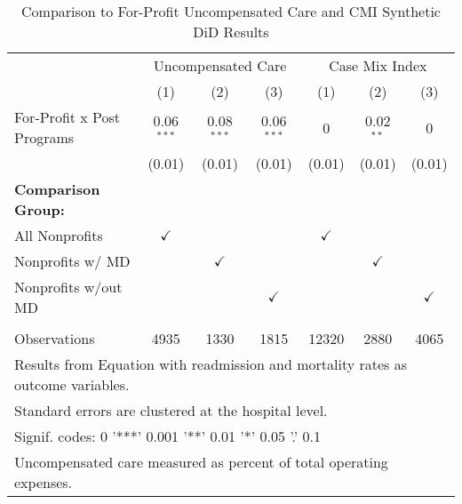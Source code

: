 \begin{table}[ht!]

\caption{\label{tab:forprofit_uncompCMI_synth}Comparison to For-Profit Uncompensated Care and CMI Synthetic DiD Results}
\centering
\begin{tabular}[t]{lcccccc}
\toprule
\multicolumn{1}{c}{ } & \multicolumn{3}{c}{Uncompensated Care} & \multicolumn{3}{c}{Case Mix Index} \\
\cmidrule(l{3pt}r{3pt}){2-4} \cmidrule(l{3pt}r{3pt}){5-7}
 & (1) & (2) & (3) & (1) & (2) & (3)\\
\midrule
For-Profit x Post Programs & 0.06$^{***}$ & 0.08$^{***}$ & 0.06$^{***}$ & 0 & 0.02$^{**}$ & 0\\
 & (0.01) & (0.01) & (0.01) & (0.01) & (0.01) & (0.01)\\
\textbf{Comparison Group:} &  &  &  &  &  & \\
All Nonprofits & $\checkmark$ &  &  & $\checkmark$ &  & \\
Nonprofits w/ MD &  & $\checkmark$ &  &  & $\checkmark$ & \\
\addlinespace
Nonprofits w/out MD &  &  & $\checkmark$ &  &  & $\checkmark$\\
 &  &  &  &  &  & \\
Observations & 4935 & 1330 & 1815 & 12320 & 2880 & 4065\\
\bottomrule
\multicolumn{7}{l}{\textsuperscript{} Results from Equation with readmission and mortality rates as outcome variables.}\\
\multicolumn{7}{l}{\textsuperscript{} Standard errors are clustered at the hospital level.}\\
\multicolumn{7}{l}{\textsuperscript{} Signif. codes: 0 '***' 0.001 '**' 0.01 '*' 0.05 '.' 0.1}\\
\multicolumn{7}{l}{\textsuperscript{} Uncompensated care measured as percent of total operating expenses.}\\
\end{tabular}
\end{table}
